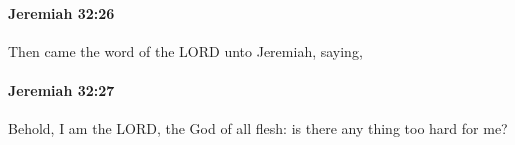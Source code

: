		\paragraph{Jeremiah 32:26} %
			\label{JEREMIAH-32-26}

			Then came the word of the LORD unto Jeremiah, saying,


		\paragraph{Jeremiah 32:27} %
			\label{JEREMIAH-32-27}

			Behold, I am the LORD, the God of all flesh: is there any thing too hard for me?


